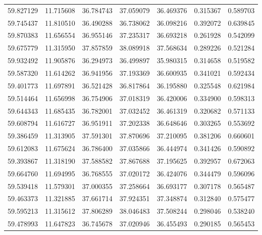\begin{tabular}{rrrrrrr}
 59.827129 &  11.715608 &         36.784743 &         37.059079 &         36.469376 &  0.315367 &  0.589703 \\
 59.745437 &  11.810510 &         36.490288 &         36.738062 &         36.098216 &  0.392072 &  0.639845 \\
 59.870383 &  11.656554 &         36.955146 &         37.235317 &         36.693218 &  0.261928 &  0.542099 \\
 59.675779 &  11.315950 &         37.857859 &         38.089918 &         37.568634 &  0.289226 &  0.521284 \\
 59.932492 &  11.905876 &         36.294973 &         36.499897 &         35.980315 &  0.314658 &  0.519582 \\
 59.587320 &  11.614262 &         36.941956 &         37.193369 &         36.600935 &  0.341021 &  0.592434 \\
 59.401773 &  11.697891 &         36.521428 &         36.817864 &         36.195880 &  0.325548 &  0.621984 \\
 59.514464 &  11.656998 &         36.754906 &         37.018319 &         36.420006 &  0.334900 &  0.598313 \\
 59.644343 &  11.685435 &         36.782001 &         37.032452 &         36.461319 &  0.320682 &  0.571133 \\
 59.608794 &  11.616727 &         36.951911 &         37.202338 &         36.648646 &  0.303265 &  0.553692 \\
 59.386459 &  11.313905 &         37.591301 &         37.870696 &         37.210095 &  0.381206 &  0.660601 \\
 59.612083 &  11.675624 &         36.786400 &         37.035866 &         36.444974 &  0.341426 &  0.590892 \\
 59.393867 &  11.318190 &         37.588582 &         37.867688 &         37.195625 &  0.392957 &  0.672063 \\
 59.664760 &  11.694995 &         36.768555 &         37.020172 &         36.424076 &  0.344479 &  0.596096 \\
 59.539418 &  11.579301 &         37.000355 &         37.258664 &         36.693177 &  0.307178 &  0.565487 \\
 59.463373 &  11.321885 &         37.661714 &         37.924351 &         37.348874 &  0.312840 &  0.575477 \\
 59.595213 &  11.315612 &         37.806289 &         38.046483 &         37.508244 &  0.298046 &  0.538240 \\
 59.478993 &  11.647823 &         36.745678 &         37.020946 &         36.455493 &  0.290185 &  0.565453 \\

\end{tabular}
